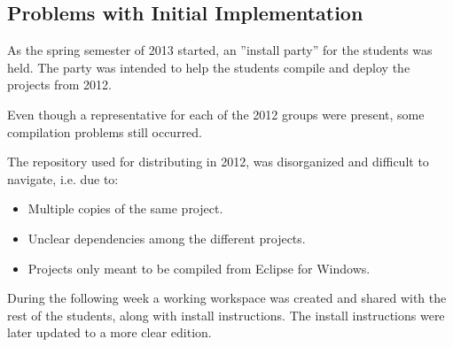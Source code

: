 \subsection*{Problems with Initial Implementation}
As the spring semester of 2013 started, an ''install party'' for the students was held. The party was intended to help the students compile and deploy the projects from 2012.

Even though a representative for each of the 2012 groups were present, some compilation problems still occurred.

The repository used for distributing in 2012, was disorganized and difficult to navigate, i.e. due to:
\begin{itemize}
  \item Multiple copies of the same project.
  \item Unclear dependencies among the different projects.
  \item Projects only meant to be compiled from Eclipse for Windows.
\end{itemize}

During the following week a working workspace was created and shared with the rest of the students, along with install instructions. The install instructions were later updated to a more clear edition.
